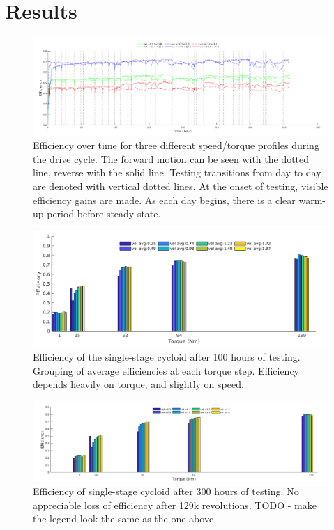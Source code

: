 \section{Results} \label{ch:single:eff_results}
\begin{figure}[h]
   \centering
   \includegraphics[width=\linewidth]{fig/total_runtime}
   \caption{Efficiency over time for three different speed/torque profiles during the drive cycle.
   The forward motion can be seen with the dotted line, reverse with the solid line.
   Testing transitions from day to day are denoted with vertical dotted lines.
   At the onset of testing, visible efficiency gains are made.
   As each day begins, there is a clear warm-up period before steady state.
   }
   \label{fig:long_run}
\end{figure}

\begin{figure}[h]
   \centering
   \includegraphics[width=0.8\linewidth]{fig/eff_test_bar_plot_v3}
   \caption{Efficiency of the single-stage cycloid after 100 hours of testing. Grouping of average efficiencies at each torque step.
   Efficiency depends heavily on torque, and slightly on speed.}
   \label{fig:eff_results}
\end{figure}

\begin{figure}[h]
   \centering
   \includegraphics[width=0.8\linewidth]{fig/eff_final}
   \caption{Efficiency of single-stage cycloid after 300 hours of testing. No appreciable loss of efficiency after 129k revolutions. TODO - make the legend look the same as the one above }
   \label{fig:eff_results_final}
\end{figure}

